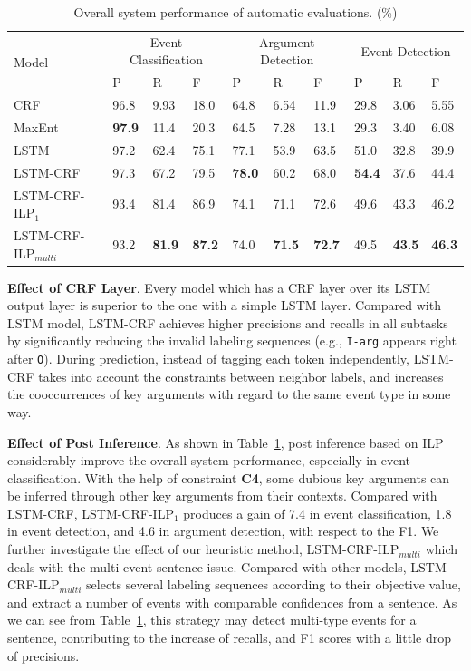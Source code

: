 \documentclass{article}
\begin{document}
\begin{table}[!t]
\centering
\small
\begin{tabular}{|l|p{0.8cm}<{\centering}|p{0.8cm}<{\centering}|p{0.8cm}<{\centering}|p{0.8cm}<{\centering}|p{0.8cm}<{\centering}|p{0.8cm}<{\centering}|p{0.8cm}<{\centering}|p{0.8cm}<{\centering}|p{0.8cm}<{\centering}|} \hline
	\multirow{2}{*}{Model} & \multicolumn{3}{c|}{Event Classification} & \multicolumn{3}{c|}{Argument Detection} & 
	\multicolumn{3}{c|}{Event Detection} \\ \cline{2-10}
	 & P & R & F & P & R & F & P & R & F \\ \hline
	CRF & 96.8 & 9.93 & 18.0 & 64.8 & 6.54 & 11.9 & 29.8 & 3.06 & 5.55 \\ \hline
	MaxEnt & \textbf{97.9} & 11.4 & 20.3 & 64.5 & 7.28 & 13.1 & 29.3 & 3.40 & 6.08 \\ \hline
	LSTM & 97.2 & 62.4 & 75.1 & 77.1 & 53.9 & 63.5 & 51.0 & 32.8 & 39.9  \\ \hline \hline
	LSTM-CRF & 97.3 & 67.2 & 79.5 & \textbf{78.0} & 60.2 & 68.0  & \textbf{54.4} & 37.6 & 44.4  \\ \hline
	LSTM-CRF-ILP$_{1}$ & 93.4 & 81.4 & 86.9 & 74.1 & 71.1 & 72.6  & 49.6 & 43.3 & 46.2 \\ \hline
	LSTM-CRF-ILP$_{multi}$ & 93.2 & \textbf{81.9} & \textbf{87.2} &  74.0 & \textbf{71.5} & \textbf{72.7} & 49.5 & \textbf{43.5} & \textbf{46.3} \\ \hline
\end{tabular}
\caption{Overall system performance of automatic evaluations. (\%) \label{tab:1}}
\end{table}

\noindent \textbf{Effect of CRF Layer}. Every model which has a CRF layer over its LSTM output layer is superior to the one with a simple LSTM layer. Compared with LSTM model, LSTM-CRF achieves higher precisions and recalls in all subtasks by significantly reducing the invalid labeling sequences (e.g., \texttt{I-arg} appears right after \texttt{O}). During prediction, instead of tagging each token independently, LSTM-CRF takes into account the constraints between neighbor labels, and increases the cooccurrences of key arguments with regard to the same event type in some way.

\noindent \textbf{Effect of Post Inference}. As shown in Table~\ref{tab:1}, post inference based on ILP considerably improve the overall system performance, especially in event classification. With the help of constraint \textbf{C4},  some dubious key arguments can be inferred through other key arguments from their contexts. Compared with LSTM-CRF, LSTM-CRF-ILP$_1$ produces a gain of 7.4 in event classification, 1.8 in event detection, and 4.6 in argument detection, with respect to the F1. We further investigate the effect of our heuristic method, LSTM-CRF-ILP$_{multi}$ which deals with the multi-event sentence issue. Compared with other models, LSTM-CRF-ILP$_{multi}$ selects several labeling sequences according to their objective value, and extract a number of events with comparable confidences from a sentence. As we can see from Table~\ref{tab:1}, this strategy may detect multi-type events for a sentence, contributing to the increase of recalls, and F1 scores with a little drop of precisions. 
\end{document}
